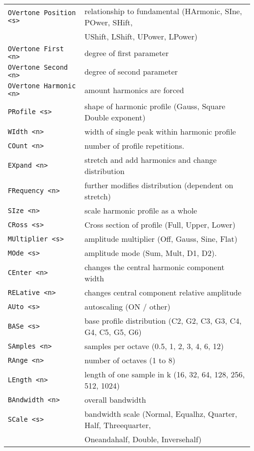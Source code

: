 \begin{center}
\begin{longtable}{p{5cm} p{13cm}}
\texttt{OVertone Position <s>} &
   relationship to fundamental (HArmonic, SIne, POwer, SHift, \\
\texttt{} &
   UShift, LShift, UPower, LPower) \\
\texttt{OVertone First <n>} &
   degree of first parameter \\
\texttt{OVertone Second <n>} &
   degree of second parameter\\
\texttt{OVertone Harmonic <n>} &
   amount harmonics are forced\\
\texttt{PRofile <s>} &
   shape of harmonic profile (Gauss, Square Double exponent) \\
\texttt{WIdth <n>} &
   width of single peak within harmonic profile \\
\texttt{COunt <n>} &
   number of profile repetitions. \\
\texttt{EXpand <n>} &
  stretch and add harmonics and change distribution \\
\texttt{FRequency <n>} &
   further modifies distribution (dependent on stretch) \\
\texttt{SIze <n>} &
   scale harmonic profile as a whole \\
\texttt{CRoss <s>} &
   Cross section of profile (Full, Upper, Lower) \\
\texttt{MUltiplier <s>} &
   amplitude multiplier (Off, Gauss, Sine, Flat) \\
\texttt{MOde <s>} &
   amplitude mode (Sum, Mult, D1, D2). \\
\texttt{CEnter <n>} &
   changes the central harmonic component width \\
\texttt{RELative <n>} &
   changes central component relative amplitude \\
\texttt{AUto <s>} &
   autoscaling (ON / other) \\
\texttt{BASe <s>} &
   base profile distribution (C2, G2, C3, G3, C4, G4, C5, G5, G6) \\
\texttt{SAmples <n>} &
   samples per octave (0.5, 1, 2, 3, 4, 6, 12) \\
\texttt{RAnge <n>} &
   number of octaves (1 to 8) \\
\texttt{LEngth <n>} &
   length of one sample in k (16, 32, 64, 128, 256, 512, 1024) \\
\texttt{BAndwidth <n>} &
   overall bandwidth \\
\texttt{SCale <s>} &
   bandwidth scale (Normal, Equalhz, Quarter, Half, Threequarter,\\
\texttt{} &
   Oneandahalf, Double, Inversehalf)\\

\end{longtable}
\end{center}
